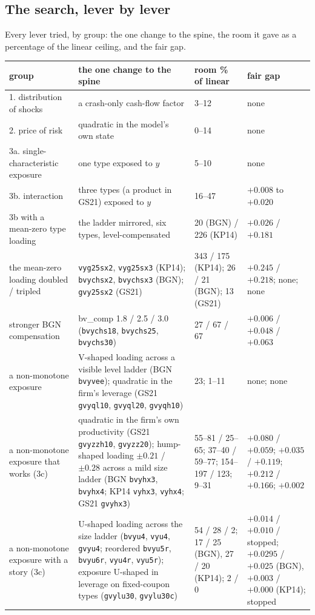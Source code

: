 \subsection*{The search, lever by lever}
Every lever tried, by group: the one change to the spine, the room it gave as a percentage of the linear ceiling, and the fair gap.
\begin{center}\small
\begin{tabular}{p{4.3cm}p{5.4cm}p{2.4cm}p{3.2cm}}\hline
group & the one change to the spine & room \% of linear & fair gap \\\hline
1. distribution of shocks & a crash-only cash-flow factor & 3--12 & none \\
2. price of risk & quadratic in the model's own state & 0--14 & none \\
3a. single-characteristic exposure & one type exposed to $y$ & 5--10 & none \\
3b. interaction & three types (a product in GS21) exposed to $y$ & 16--47 & $+0.008$ to $+0.020$ \\
3b with a mean-zero type loading & the ladder mirrored, six types, level-compensated & 20 (BGN) / 226 (KP14) & $+0.026$ / $+0.181$ \\
the mean-zero loading doubled / tripled & \texttt{vyg25sx2}, \texttt{vyg25sx3} (KP14); \texttt{bvychsx2}, \texttt{bvychsx3} (BGN); \texttt{gvy25sx2} (GS21) & 343 / 175 (KP14); 26 / 21 (BGN); 13 (GS21) & $+0.245$ / $+0.218$; none; none \\
stronger BGN compensation & bv\_comp 1.8 / 2.5 / 3.0 (\texttt{bvychs18}, \texttt{bvychs25}, \texttt{bvychs30}) & 27 / 67 / 67 & $+0.006$ / $+0.048$ / $+0.063$ \\
a non-monotone exposure & V-shaped loading across a visible level ladder (BGN \texttt{bvyvee}); quadratic in the firm's leverage (GS21 \texttt{gvyql10}, \texttt{gvyql20}, \texttt{gvyqh10}) & 23; 1--11 & none; none \\
a non-monotone exposure that works (3c) & quadratic in the firm's own productivity (GS21 \texttt{gvyzzh10}, \texttt{gvyzz20}); hump-shaped loading $\pm0.21$ / $\pm0.28$ across a mild size ladder (BGN \texttt{bvyhx3}, \texttt{bvyhx4}; KP14 \texttt{vyhx3}, \texttt{vyhx4}; GS21 \texttt{gvyhx3}) & 55--81 / 25--65; 37--40 / 59--77; 154--197 / 123; 9--31 & $+0.080$ / $+0.059$; $+0.035$ / $+0.119$; $+0.212$ / $+0.166$; $+0.002$ \\
a non-monotone exposure with a story (3c) & U-shaped loading across the size ladder (\texttt{bvyu4}, \texttt{vyu4}, \texttt{gvyu4}; reordered \texttt{bvyu5r}, \texttt{bvyu6r}, \texttt{vyu4r}, \texttt{vyu5r}); exposure U-shaped in leverage on fixed-coupon types (\texttt{gvylu30}, \texttt{gvylu30c}) & 54 / 28 / 2; 17 / 25 (BGN), 27 / 20 (KP14); 2 / 0 & $+0.014$ / $+0.010$ / stopped; $+0.0295$ / $+0.025$ (BGN), $+0.003$ / $+0.000$ (KP14); stopped \\

\end{tabular}
\end{center}
